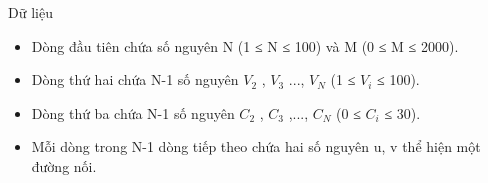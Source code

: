 Dữ liệu
\begin{itemize}
	\item Dòng đầu tiên chứa số nguyên N (1 ≤ N ≤ 100) và M (0 ≤ M ≤ 2000).
	\item Dòng thứ hai chứa N-1 số nguyên $V_{2}$ , $V_{3}$ ..., $V_{N}$ (1 ≤ $V_{i}$ ≤ 100).
	\item Dòng thứ ba chứa N-1 số nguyên $C_{2}$ , $C_{3}$ ,..., $C_{N}$ (0 ≤ $C_{i}$ ≤ 30).
	\item Mỗi dòng trong N-1 dòng tiếp theo chứa hai số nguyên u, v thể hiện một đường nối.
\end{itemize}